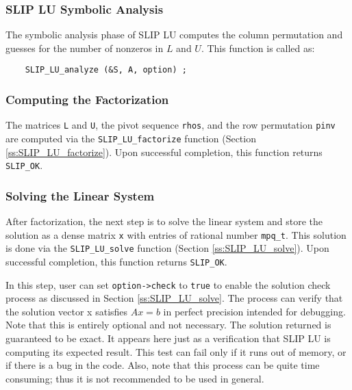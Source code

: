 \documentclass[12pt]{article}
\theoremstyle{definition}
\begin{document}
\subsubsection{SLIP LU Symbolic Analysis}

The symbolic analysis phase of SLIP LU computes the column permutation and
guesses for the number of nonzeros in $L$ and $U$. This function is called as:

{\small
    \begin{verbatim}
    SLIP_LU_analyze (&S, A, option) ; \end{verbatim} }


\subsubsection{Computing the Factorization}

The matrices \verb|L| and \verb|U|, the pivot sequence \verb|rhos|, and the row
permutation \verb|pinv| are computed via the \verb|SLIP_LU_factorize| function
(Section \ref{ss:SLIP_LU_factorize}).  Upon successful completion, this
function returns \verb|SLIP_OK|.

\subsubsection{Solving the Linear System}

After factorization, the next step is to solve the linear system and store the
solution as a dense matrix \verb|x| with entries of rational number
\verb|mpq_t|. This solution is done via the \verb|SLIP_LU_solve|
function (Section \ref{ss:SLIP_LU_solve}). 
Upon successful completion, this function returns \verb|SLIP_OK|.

In this step, user can set \verb|option->check| to \verb|true| to enable
the solution check process as discussed in Section \ref{ss:SLIP_LU_solve}.
The process can verify that the solution vector x satisfies $Ax=b$ in perfect
precision intended for debugging.  Note that this is entirely optional and not
necessary. The solution returned is guaranteed to be exact.   It appears here
just as a verification that SLIP LU is computing its expected result.  This
test can fail only if it runs out of memory, or if there is a bug in the code.
Also, note that this process can be quite time consuming; thus it is not
recommended to be used in general.
\end{document}
